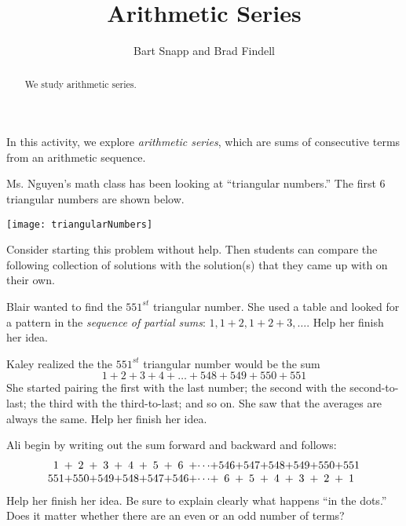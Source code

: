 \documentclass[nooutcomes]{ximera}
\title{Arithmetic Series}
\author{Bart Snapp and Brad Findell}
\begin{document}
\begin{abstract}
We study arithmetic series.
\end{abstract}
\maketitle

\label{A:arithmeticSeries}

In this activity, we explore \emph{arithmetic series}, which are sums of consecutive terms from an arithmetic sequence.

Ms. Nguyen's math class has been looking at ``triangular numbers.''  The first 6 triangular numbers are shown below. 
\begin{image}
\texttt{[image: triangularNumbers]} %
\end{image}

\begin{teachingnote}
Consider starting this problem without help.  Then students can 
compare the following collection of solutions with the solution(s) that they came up with on their own. 
\end{teachingnote}

\begin{problem}
Blair wanted to find the $551^{st}$ triangular number.  She used a table and looked for a pattern in the \emph{sequence of partial sums}:  $1, 1+2, 1+2+3, \dots$.  Help her finish her idea.  
\end{problem}

\begin{problem}
Kaley realized the the $551^{st}$ triangular number would be the sum 
\[
1+2+3+4+\dots+548+549+550+551
\]
She started pairing the first with the last number; the second with the second-to-last; the third with the third-to-last; and so on.  She saw that the averages are always the same.  Help her finish her idea.  
\end{problem}

\begin{problem}
Ali begin by writing out the sum forward and backward and follows:  
\[
\begin{array}{c@{ + }c@{ + }c@{ + }c@{ + }c@{ + }c@{ + }c@{ + }c@{ + }c@{ + }c@{ + }c@{ + }c@{ + }c}
1 & 2 & 3 & 4 & 5 & 6 & \cdots & 546 & 547 & 548 & 549 & 550 & 551 \\
551 & 550 & 549 & 548 & 547 & 546 & \cdots & 6 & 5 & 4 & 3 & 2 & 1 
\end{array}
\]
Help her finish her idea.  Be sure to explain clearly what happens ``in the dots.''  Does it matter whether there are an even or an odd number of terms?  
\end{problem}
\end{document}
